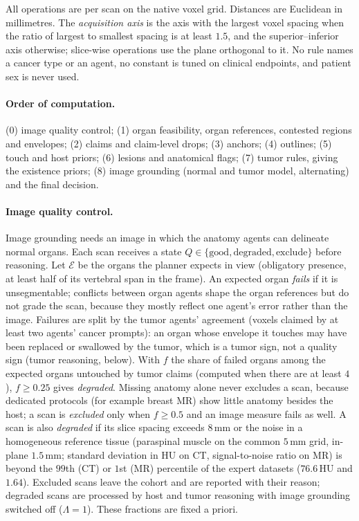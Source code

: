 \documentclass[fleqn,10pt]{olplainarticle}
\begin{document}
All operations are per scan on the native voxel grid. Distances are Euclidean in millimetres. The \emph{acquisition axis}
is the axis with the largest voxel spacing when the ratio of largest to smallest spacing is at least $1.5$, and the
superior--inferior axis otherwise; slice-wise operations use the plane orthogonal to it. No rule names a cancer type or an
agent, no constant is tuned on clinical endpoints, and patient sex is never used.

\paragraph{Order of computation.} (0) image quality control; (1) organ feasibility, organ references, contested regions and
envelopes; (2) claims and claim-level drops; (3) anchors; (4) outlines; (5) touch and host priors; (6) lesions and anatomical
flags; (7) tumor rules, giving the existence priors; (8) image grounding (normal and tumor model, alternating) and the final
decision.

\paragraph{Image quality control.}
\label{sec:qc_details}
Image grounding needs an image in which the anatomy agents can delineate normal organs. Each scan receives a state
$Q\in\{\text{good},\text{degraded},\text{exclude}\}$ before reasoning. Let $\mathcal{E}$ be the organs the planner expects in
view (obligatory presence, at least half of its vertebral span in the frame). An expected organ \emph{fails} if it is
unsegmentable; conflicts between organ agents shape the organ references but do not grade the scan, because they mostly
reflect one agent's error rather than the image. Failures are split by the tumor agents' agreement (voxels claimed by at
least two agents' cancer prompts): an organ whose envelope it touches may have been replaced or swallowed by the tumor,
which is a tumor sign, not a quality sign (tumor reasoning, below). With $f$ the share of failed organs among the
expected organs untouched by tumor claims (computed when there are at least $4$), $f\ge0.25$ gives \emph{degraded}. Missing
anatomy alone never excludes a scan, because dedicated protocols (for example breast MR) show little anatomy besides the
host; a scan is \emph{excluded} only when $f\ge0.5$ and an image measure fails as well. A scan is also \emph{degraded} if its slice spacing exceeds $8$\,mm or the noise in a
homogeneous reference tissue (paraspinal muscle on the common $5$\,mm grid, in-plane $1.5$\,mm; standard deviation in HU on
CT, signal-to-noise ratio on MR) is beyond the $99$th (CT) or $1$st (MR) percentile of the expert datasets
($76.6$\,HU and $1.64$). Excluded scans leave the cohort and are reported with their reason; degraded scans
are processed by host and tumor reasoning with image grounding switched off ($\Lambda=1$). These fractions are fixed a priori.
\end{document}
